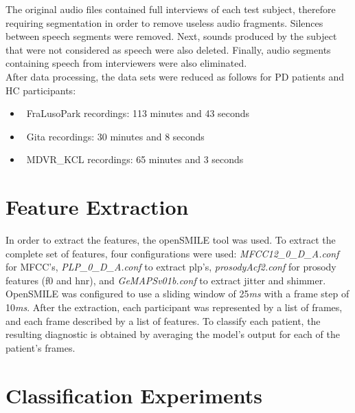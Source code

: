 The original audio files contained full interviews of each test subject, therefore requiring segmentation in order to remove useless audio fragments. Silences between speech segments were removed. Next, sounds produced by the subject that were not considered as speech were also deleted. Finally, audio segments containing speech from interviewers were also eliminated.
\\
After data processing, the data sets were reduced as follows for PD patients and HC participants:

\begin{itemize}
	\item ~FraLusoPark recordings: 113 minutes and 43 seconds
	\item ~Gita recordings: 30 minutes and 8 seconds
	\item ~MDVR\_KCL recordings: 65 minutes and 3 seconds
	
\end{itemize}

\section{Feature Extraction}

In order to extract the features, the openSMILE \cite{openSMILE} tool was used. To extract the complete set of features, four configurations were used: \textit{MFCC12\_0\_D\_A.conf} for MFCC's, \textit{PLP\_0\_D\_A.conf} to extract \gls{plp}'s, \textit{prosodyAcf2.conf} for prosody features (\gls{f0} and \gls{hnr}), and \textit{GeMAPSv01b.conf} to extract jitter and shimmer.
\\
OpenSMILE was configured to use a sliding window of 25\textit{ms} with a frame step of 10\textit{ms}. After the extraction, each participant was represented by a list of frames, and each frame described by a list of features. To classify each patient, the resulting diagnostic is obtained by averaging the model's output for each of the patient's frames.

\section{Classification Experiments}

